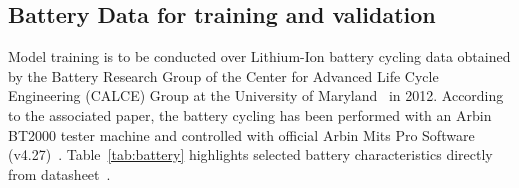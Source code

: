 \subsection{Battery Data for training and validation} \label{subsec:b_data}
%
Model training is to be conducted over Lithium-Ion battery cycling data obtained by the Battery Research Group of the Center for Advanced Life Cycle Engineering (CALCE) Group at the University of Maryland~\cite{noauthor_calce_2017} in 2012.
According to the associated paper, the battery cycling has been performed with an Arbin BT2000 tester machine and controlled with official Arbin Mits Pro Software (v4.27)~\cite{xing_state_2014}.
\mbox{Table~\ref{tab:battery}} highlights selected battery characteristics directly from datasheet~\cite{noauthor_anr26650m1a}.
